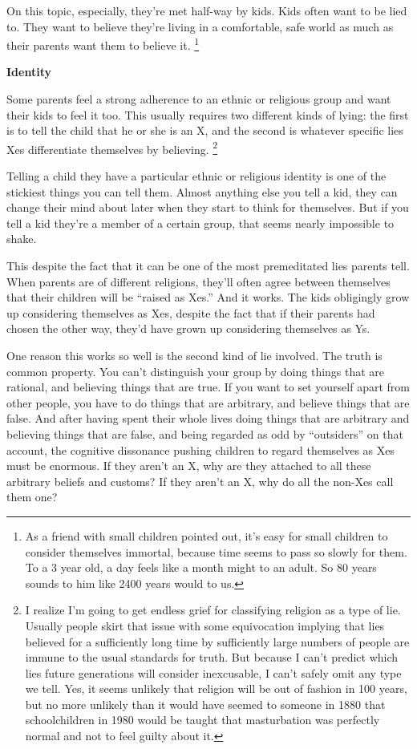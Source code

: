 \documentclass[12pt]{book}
\begin{document}
On this topic, especially, they're met half-way by kids. Kids often want
to be lied to. They want to believe they're living in a comfortable,
safe world as much as their parents want them to believe it.
\footnote{As a friend with small children pointed out, it's easy for small
children to consider themselves immortal, because time seems to pass so
slowly for them. To a 3 year old, a day feels like a month might to an
adult. So 80 years sounds to him like 2400 years would to us.}

\textbf{Identity}

Some parents feel a strong adherence to an ethnic or religious group and
want their kids to feel it too. This usually requires two different
kinds of lying: the first is to tell the child that he or she is an X,
and the second is whatever specific lies Xes differentiate themselves by
believing. \footnote{I realize I'm going to get endless grief for classifying
religion as a type of lie. Usually people skirt that issue with some
equivocation implying that lies believed for a sufficiently long time by
sufficiently large numbers of people are immune to the usual standards
for truth. But because I can't predict which lies future generations
will consider inexcusable, I can't safely omit any type we tell. Yes, it
seems unlikely that religion will be out of fashion in 100 years, but no
more unlikely than it would have seemed to someone in 1880 that
schoolchildren in 1980 would be taught that masturbation was perfectly
normal and not to feel guilty about it.}

Telling a child they have a particular ethnic or religious identity is
one of the stickiest things you can tell them. Almost anything else you
tell a kid, they can change their mind about later when they start to
think for themselves. But if you tell a kid they're a member of a
certain group, that seems nearly impossible to shake.

This despite the fact that it can be one of the most premeditated lies
parents tell. When parents are of different religions, they'll often
agree between themselves that their children will be ``raised as Xes.''
And it works. The kids obligingly grow up considering themselves as Xes,
despite the fact that if their parents had chosen the other way, they'd
have grown up considering themselves as Ys.

One reason this works so well is the second kind of lie involved. The
truth is common property. You can't distinguish your group by doing
things that are rational, and believing things that are true. If you
want to set yourself apart from other people, you have to do things that
are arbitrary, and believe things that are false. And after having spent
their whole lives doing things that are arbitrary and believing things
that are false, and being regarded as odd by ``outsiders'' on that
account, the cognitive dissonance pushing children to regard themselves
as Xes must be enormous. If they aren't an X, why are they attached to
all these arbitrary beliefs and customs? If they aren't an X, why do all
the non-Xes call them one?
\end{document}
